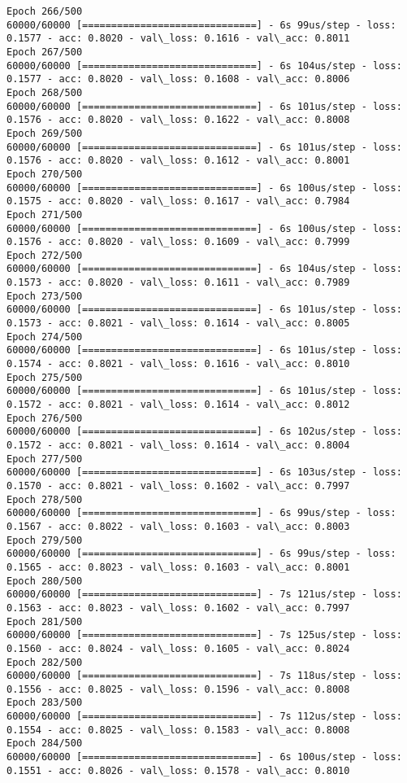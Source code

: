 \documentclass[11pt]{article}
\begin{document}
\begin{Verbatim}[commandchars=\\\{\}]
Epoch 266/500
60000/60000 [==============================] - 6s 99us/step - loss: 0.1577 - acc: 0.8020 - val\_loss: 0.1616 - val\_acc: 0.8011
Epoch 267/500
60000/60000 [==============================] - 6s 104us/step - loss: 0.1577 - acc: 0.8020 - val\_loss: 0.1608 - val\_acc: 0.8006
Epoch 268/500
60000/60000 [==============================] - 6s 101us/step - loss: 0.1576 - acc: 0.8020 - val\_loss: 0.1622 - val\_acc: 0.8008
Epoch 269/500
60000/60000 [==============================] - 6s 101us/step - loss: 0.1576 - acc: 0.8020 - val\_loss: 0.1612 - val\_acc: 0.8001
Epoch 270/500
60000/60000 [==============================] - 6s 100us/step - loss: 0.1575 - acc: 0.8020 - val\_loss: 0.1617 - val\_acc: 0.7984
Epoch 271/500
60000/60000 [==============================] - 6s 100us/step - loss: 0.1576 - acc: 0.8020 - val\_loss: 0.1609 - val\_acc: 0.7999
Epoch 272/500
60000/60000 [==============================] - 6s 104us/step - loss: 0.1573 - acc: 0.8020 - val\_loss: 0.1611 - val\_acc: 0.7989
Epoch 273/500
60000/60000 [==============================] - 6s 101us/step - loss: 0.1573 - acc: 0.8021 - val\_loss: 0.1614 - val\_acc: 0.8005
Epoch 274/500
60000/60000 [==============================] - 6s 101us/step - loss: 0.1574 - acc: 0.8021 - val\_loss: 0.1616 - val\_acc: 0.8010
Epoch 275/500
60000/60000 [==============================] - 6s 101us/step - loss: 0.1572 - acc: 0.8021 - val\_loss: 0.1614 - val\_acc: 0.8012
Epoch 276/500
60000/60000 [==============================] - 6s 102us/step - loss: 0.1572 - acc: 0.8021 - val\_loss: 0.1614 - val\_acc: 0.8004
Epoch 277/500
60000/60000 [==============================] - 6s 103us/step - loss: 0.1570 - acc: 0.8021 - val\_loss: 0.1602 - val\_acc: 0.7997
Epoch 278/500
60000/60000 [==============================] - 6s 99us/step - loss: 0.1567 - acc: 0.8022 - val\_loss: 0.1603 - val\_acc: 0.8003
Epoch 279/500
60000/60000 [==============================] - 6s 99us/step - loss: 0.1565 - acc: 0.8023 - val\_loss: 0.1603 - val\_acc: 0.8001
Epoch 280/500
60000/60000 [==============================] - 7s 121us/step - loss: 0.1563 - acc: 0.8023 - val\_loss: 0.1602 - val\_acc: 0.7997
Epoch 281/500
60000/60000 [==============================] - 7s 125us/step - loss: 0.1560 - acc: 0.8024 - val\_loss: 0.1605 - val\_acc: 0.8024
Epoch 282/500
60000/60000 [==============================] - 7s 118us/step - loss: 0.1556 - acc: 0.8025 - val\_loss: 0.1596 - val\_acc: 0.8008
Epoch 283/500
60000/60000 [==============================] - 7s 112us/step - loss: 0.1554 - acc: 0.8025 - val\_loss: 0.1583 - val\_acc: 0.8008
Epoch 284/500
60000/60000 [==============================] - 6s 100us/step - loss: 0.1551 - acc: 0.8026 - val\_loss: 0.1578 - val\_acc: 0.8010

\end{Verbatim}
\end{document}
